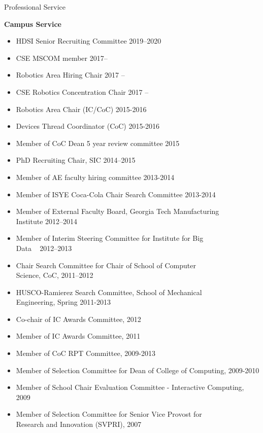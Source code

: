 \documentclass{article}
\begin{document}
\begin{cv}
\begin{cvlist}{Professional Service}
\item {\bf Campus Service}
  \begin{itemize}
  \item HDSI Senior Recruiting Committee  \cftdotfill{\cftdotsep} 2019--2020
  \item CSE MSCOM member \cftdotfill{\cftdotsep} 2017--
  \item Robotics Area Hiring Chair \cftdotfill{\cftdotsep} 2017 --
  \item CSE Robotics Concentration Chair \cftdotfill{\cftdotsep}
    2017 --
  \item Robotics Area Chair (IC/CoC) \cftdotfill{\cftdotsep} 2015-2016
  \item Devices Thread Coordinator (CoC) \cftdotfill{\cftdotsep} 2015-2016
  \item Member of CoC Dean 5 year review committee
    \cftdotfill{\cftdotsep} 2015
  \item PhD Recruiting Chair, SIC \cftdotfill{\cftdotsep} 2014--2015
  \item Member of AE faculty hiring committee \cftdotfill{\cftdotsep}
    2013-2014
  \item Member of ISYE Coca-Cola Chair Search Committee
    \cftdotfill{\cftdotsep} 2013-2014
  \item Member of External Faculty Board, Georgia Tech Manufacturing\\
    Institute \cftdotfill{\cftdotsep} 2012--2014
  \item Member of Interim Steering Committee for Institute for Big
    \\Data ~ \cftdotfill{\cftdotsep} 2012--2013
  \item Chair Search Committee for Chair of School of Computer\\
    Science, CoC, \cftdotfill{\cftdotsep} 2011--2012
  \item HUSCO-Ramierez Search Committee, School of Mechanical\\
    Engineering, Spring \cftdotfill{\cftdotsep} 2011-2013
  \item Co-chair of IC Awards Committee, \cftdotfill{\cftdotsep} 2012
  \item Member of IC Awards Committee, \cftdotfill{\cftdotsep} 2011
  \item Member of CoC RPT Committee, \cftdotfill{\cftdotsep} 2009-2013
  \item Member of Selection Committee for Dean of College of
    Computing, \cftdotfill{\cftdotsep} 2009-2010
  \item Member of School Chair Evaluation Committee - Interactive
    Computing, \cftdotfill{\cftdotsep} 2009
  \item Member of Selection Committee for Senior Vice Provost for \\
    Research and Innovation (SVPRI), \cftdotfill{\cftdotsep} 2007
  \end{itemize}


\end{cvlist}
\end{cv}
\end{document}
